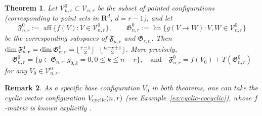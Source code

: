 \documentclass[11pt]{article}
\newtheorem{theorem}{Theorem}
\newtheorem{remark}[theorem]{Remark}
\DeclareMathOperator{\aff}{aff}
\DeclareMathOperator{\lin}{lin}
\newcommand{\fspace}{\mathfrak{F}}
\newcommand{\gspace}{\mathfrak{G}}
\renewcommand{\leq}{\leqslant}
\newcommand{\R}{\mathbf{R}}
\DeclarePairedDelimiter\floor{\lfloor}{\rfloor}
\newcommand{\cyclic}{V_{\textup{cyclic}}}
\begin{document}
%
\begin{theorem}
\label{thm:f-space-g-space-pointed}
Let $\mathcal{V}^0_{n,r} \subset \mathcal{V}_{n,r}$ be the subset of pointed configurations (corresponding to point sets in $\R^d$, $d=r-1$), and let  
\[
\fspace^0_{n,r}:=\aff\{f(V)\colon V\in \mathcal{V}^0_{n,r}\}, \qquad \gspace^0_{n,r}:=\lin\{g(V \to W) \colon V,W \in \mathcal{V}^0_{n,r}\}
\]
be the corresponding subspaces of $\fspace_{n,r}$ and $\gspace_{r,n}$. Then $\dim \fspace^0_{n,r}=\dim \gspace^0_{n,r}=\floor{\frac{r-1}{2}}\cdot \floor{\frac{n-r+1}{2}}$. More precisely, 
\[
\gspace^0_{n,r}=\{g\in \gspace_{n,r}\colon g_{0,k}=0, 0\leq k \leq n-r\},\quad \textrm{and}\quad \fspace^0_{n,r}=f(V_0)+T(\gspace^0_{n,r})
\]
for any $V_0 \in \mathcal{V}^0_{n,r}$.
\end{theorem}
%
\begin{remark}
As a specific base configuration $V_0$ in both theorems, one can take the \emph{cyclic} vector configuration $\cyclic(n,r)$ (see Example~\ref{ex:cyclic-cocyclic}), whose $f$-matrix is known explicitly \cite{Andrzejak:2003aa}. 
\end{remark}
%
%
%
%
\end{document}
